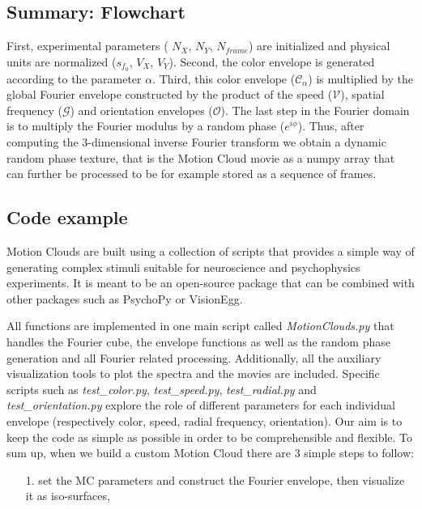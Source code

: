 \documentclass[a4paper,11pt]{article}%
\begin{document}
\subsection{Summary: Flowchart}\label{subsection:flowchart}
 First, experimental parameters ( $N_{X}$, $N_{Y}$, $N_{frame}$) are initialized and physical units are normalized ($s_{f_0}$, $V_X$, $V_Y$).  Second, the color envelope is generated according to the parameter $\alpha$. Third, this color envelope ($\mathcal{C_{\alpha}}$) is multiplied by the global Fourier envelope constructed by the product of the speed ($\mathcal{V}$), spatial frequency ($\mathcal{G}$) and orientation envelopes ($\mathcal{O}$). The last step in the Fourier domain is to multiply the Fourier modulus by  a random phase ($e^{i\phi}$). Thus, after computing the 3-dimensional inverse Fourier transform we obtain a dynamic random phase texture, that is the Motion Cloud movie as a numpy array that can further be processed to be for example stored as a sequence of frames.


\subsection{Code example}
\label{subsection:implementation}

Motion Clouds are built using a collection of scripts that provides a simple way of generating complex stimuli suitable for neuroscience and psychophysics experiments. It is meant to be an open-source package  that can be combined with other packages such as PsychoPy or VisionEgg.%

All functions are implemented in one main script called \textit{MotionClouds.py} that handles the Fourier cube, the envelope functions as well as the random phase generation and all Fourier related processing. Additionally, all the auxiliary visualization tools to plot the spectra and the movies are included. Specific scripts such as \textit{test\_color.py}, \textit{test\_speed.py}, \textit{test\_radial.py} and \textit{test\_orientation.py} explore the role of different parameters for each individual envelope (respectively color, speed, radial frequency, orientation). Our aim is to keep the code as simple as possible in order to be comprehensible and flexible. To sum up, when we build a custom  Motion Cloud there are 3 simple steps to follow:

\begin{enumerate}
\item[1.] set the MC parameters and construct the Fourier envelope, then visualize it as iso-surfaces,
\end{enumerate}
\end{document}
